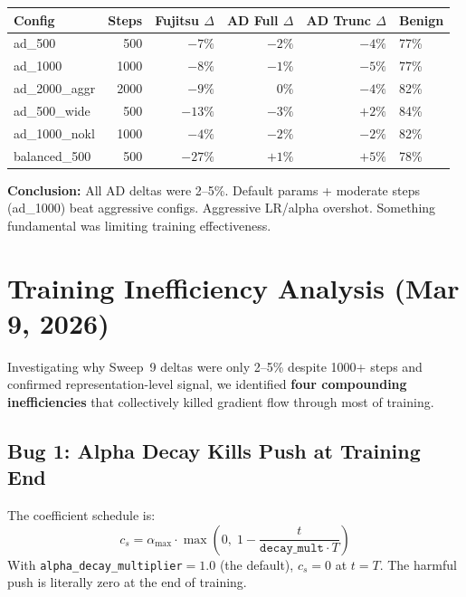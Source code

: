 \documentclass[11pt]{article}
\newcommand{\good}[1]{\textcolor{good}{#1}}
\begin{document}
\begin{center}
\small
\begin{tabular}{lrrrrl}
\toprule
Config & Steps & Fujitsu $\Delta$ & AD Full $\Delta$ & AD Trunc $\Delta$ & Benign \\
\midrule
ad\_500         & 500  & $-7\%$  & $-2\%$  & $-4\%$           & 77\% \\
ad\_1000        & 1000 & $-8\%$  & $-1\%$  & \good{$-5\%$}    & 77\% \\
ad\_2000\_aggr  & 2000 & $-9\%$  & $0\%$   & $-4\%$           & 82\% \\
ad\_500\_wide   & 500  & $-13\%$ & $-3\%$  & $+2\%$           & 84\% \\
ad\_1000\_nokl  & 1000 & $-4\%$  & $-2\%$  & $-2\%$           & 82\% \\
balanced\_500   & 500  & $-27\%$ & $+1\%$  & $+5\%$           & 78\% \\
\bottomrule
\end{tabular}
\end{center}

\textbf{Conclusion:} All AD deltas were 2--5\%. Default params + moderate steps
(ad\_1000) beat aggressive configs. Aggressive LR/alpha overshot. Something
fundamental was limiting training effectiveness.

\section{Training Inefficiency Analysis (Mar 9, 2026)}
\label{sec:inefficiency}

Investigating why Sweep~9 deltas were only 2--5\% despite 1000+ steps and
confirmed representation-level signal, we identified \textbf{four compounding
inefficiencies} that collectively killed gradient flow through most of training.

\subsection{Bug 1: Alpha Decay Kills Push at Training End}

The coefficient schedule is:
\begin{equation}
  c_s = \alpha_{\max} \cdot \max\!\left(0,\; 1 - \frac{t}{\texttt{decay\_mult} \cdot T}\right)
\end{equation}
With \texttt{alpha\_decay\_multiplier}$=1.0$ (the default), $c_s = 0$ at
$t = T$. The harmful push is literally zero at the end of training.
\end{document}
